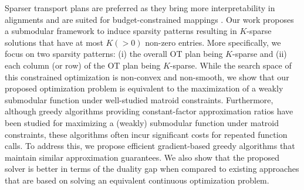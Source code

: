 Sparser transport plans are preferred as they bring more interpretability in alignments \citep{muzellec17a,swanson-etal-2020-rationalizing} and are suited for budget-constrained mappings \citep{liu2023sparsityconstrained}. Our work proposes a submodular framework to induce sparsity patterns resulting in $K$-sparse solutions that have at most $K(>0)$ non-zero entries. More specifically, we focus on two sparsity patterns: (i) the overall OT plan being $K$-sparse and (ii) each column (or row) of the OT plan being $K$-sparse. While the search space of this constrained optimization is non-convex and non-smooth, we show that our proposed optimization problem is equivalent to the maximization of a weakly submodular function under well-studied matroid constraints. Furthermore, although greedy algorithms providing constant-factor approximation ratios have been studied for maximizing a (weakly) submodular function under matroid constraints, these algorithms often incur significant costs for repeated function calls. To address this, we propose efficient gradient-based greedy algorithms that maintain similar approximation guarantees. We also show that the proposed solver is better in terms of the duality gap when compared to existing approaches that are based on solving an equivalent continuous optimization problem.

